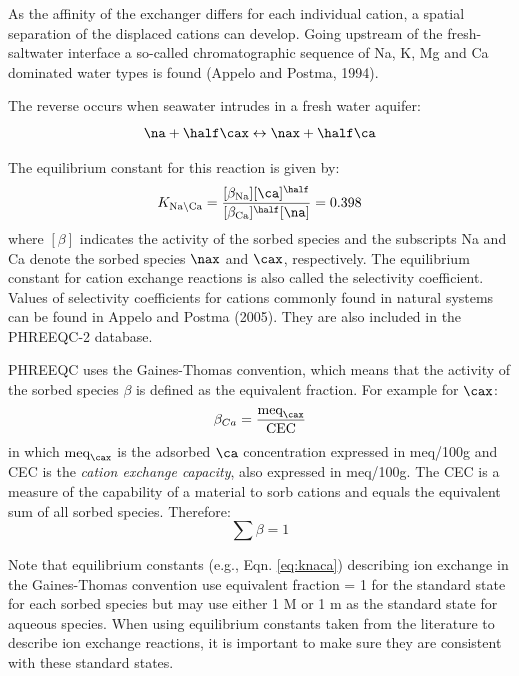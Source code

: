 As the affinity of the exchanger differs for each individual cation, a spatial separation of the displaced cations can develop. Going upstream of the fresh- saltwater interface a so-called chromatographic sequence of Na, K, Mg and Ca dominated water types is found (Appelo and Postma, 1994). 

The reverse occurs when seawater intrudes in a fresh water aquifer:
\begin{equation}
\na + \half \cax \leftrightarrow \nax + \half \ca
\end{equation}

The equilibrium constant for this reaction is given by:
\begin{equation}
K_{\text{Na} \backslash \text{Ca}} = \frac{[\beta_{\text{Na}}][\ca]^{\half}}{[\beta_{\text{Ca}}]^{\half}[\na]} = 0.398
\label{eq:knaca}
\end{equation}
where $[\beta]$ indicates the activity of the sorbed species and the subscripts Na and Ca denote the sorbed species $\nax$ and $\cax$, respectively. The equilibrium constant for cation exchange reactions is also called the selectivity coefficient. Values of selectivity coefficients for cations commonly found in natural systems can be found in Appelo and Postma (2005). They are also included in the PHREEQC-2 database.

PHREEQC uses the Gaines-Thomas convention, which means that the activity of the sorbed species $\beta$ is defined as the equivalent fraction. For example for $\cax$:
\begin{equation}
\beta_{Ca} = \frac{\text{meq}_{\cax}}{\text{CEC}}
\end{equation}
in which $\text{meq}_{\cax}$ is the adsorbed $\ca$ concentration expressed in meq/100g and CEC is the \textit{cation exchange capacity}, also expressed in meq/100g. The CEC is a measure of the capability of a material to sorb cations and equals the equivalent sum of all sorbed species. Therefore:
\begin{equation}
\sum \beta = 1
\label{eq:betas}
\end{equation}

Note that equilibrium constants (e.g., Eqn. \ref{eq:knaca}) describing ion exchange in the Gaines-Thomas convention use equivalent fraction = 1 for the standard state for each sorbed species but may use either 1 M or 1 m as the standard state for aqueous species.  When using equilibrium constants taken from the literature to describe ion exchange reactions, it is important to make sure they are consistent with these standard states.

